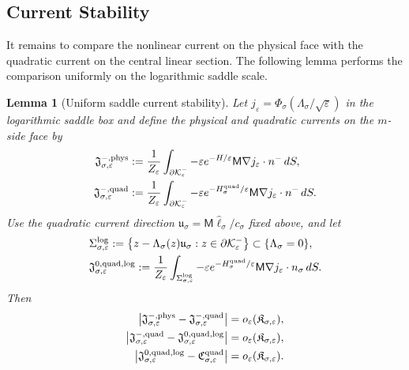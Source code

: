 \documentclass[11pt]{article}
\numberwithin{equation}{section}
\theoremstyle{plain}
\newtheorem{lemma}[theorem]{Lemma}
\theoremstyle{definition}
\theoremstyle{remark}
\newcommand{\eps}{\varepsilon}
\begin{document}
\subsection{Current Stability}
\label{app:gaussian}

It remains to compare the nonlinear current on the physical face with the
quadratic current on the central linear section.  The following lemma performs
the comparison uniformly on the logarithmic saddle scale.
\begin{lemma}[Uniform saddle current stability]
\label{lem:uniform-saddle-current-stability}
Let $j_\eps=\Phi_\sigma(\Lambda_\sigma/\sqrt\eps)$ in the logarithmic saddle box
and define the physical and quadratic currents on the $m$-side face by
\[
\begin{aligned}
\mathfrak J_{\sigma,\eps}^{-,\rm phys}
&:=\frac1{Z_\eps}\int_{\partial\mathcal K_\eps^-}
-\eps e^{-H/\eps}\mathsf M\nabla j_\eps\cdot n^-\,dS,\\
\mathfrak J_{\sigma,\eps}^{-,\rm quad}
&:=\frac1{Z_\eps}\int_{\partial\mathcal K_\eps^-}
-\eps e^{-H_\sigma^{\rm quad}/\eps}
\mathsf M\nabla j_\eps\cdot n^-\,dS.
\end{aligned}
\]
Use the quadratic current direction
$\mathfrak u_\sigma=\mathsf M\widehat\ell_\sigma/c_\sigma$ fixed above, and let
\begin{align*}
&\Sigma_{\sigma,\eps}^{\rm log}
:=\left\{z-\Lambda_\sigma(z)\mathfrak u_\sigma:
z\in\partial\mathcal K_\eps^-\right\}
\subset\{\Lambda_\sigma=0\},
\\
&\mathfrak J_{\sigma,\eps}^{0,\rm quad,log}
:=\frac1{Z_\eps}\int_{\Sigma_{\sigma,\eps}^{\rm log}}
-\eps e^{-H_\sigma^{\rm quad}/\eps}
\mathsf M\nabla j_\eps\cdot n_\sigma\,dS.
\end{align*}
Then
\begin{align}
\label{eq:current-stability-hamiltonian}
\left|\mathfrak J_{\sigma,\eps}^{-,\rm phys}
-\mathfrak J_{\sigma,\eps}^{-,\rm quad}\right|
&=o_\eps(\mathfrak K_{\sigma,\eps}),\\
\label{eq:current-stability-transport}
\left|\mathfrak J_{\sigma,\eps}^{-,\rm quad}
-\mathfrak J_{\sigma,\eps}^{0,\rm quad,log}\right|
&=o_\eps(\mathfrak K_{\sigma,\eps}),\\
\label{eq:current-stability-tail}
\left|\mathfrak J_{\sigma,\eps}^{0,\rm quad,log}
-\mathfrak C_{\sigma,\eps}^{\rm quad}\right|
&=o_\eps(\mathfrak K_{\sigma,\eps}).
\end{align}
\end{lemma}
\end{document}
